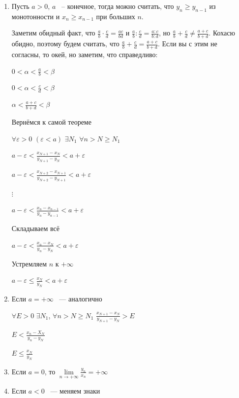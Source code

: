 \documentclass{article}
\begin{document}
			\begin{enumerate}
			
				\item Пусть $a > 0$, $a$ ~-- конечное, тогда можно считать, что $y_n \geq y_{n - 1}$ из монотонности и $x_n \geq x_{n - 1}$ при больших $n$.
			
					Заметим обидный факт, что $\frac{a}{b} \cdot \frac{c}{d} = \frac{ac}{bd}$ и $\frac{a}{b} : \frac{c}{d} = \frac{a : c}{b : d}$, но $\frac{a}{b} + \frac{c}{d} \neq \frac{a + c}{b + d}$. Кохасю обидно, поэтому будем считать, что $\frac{a}{b} + \frac{c}{d} = \frac{a + c}{b + d}$. Если вы с этим не согласны, то окей, но заметим, что справедливо:
			
					$0 < \alpha < \frac{a}{b} < \beta$
			
					$0 < \alpha < \frac{c}{d} < \beta$
			
					$\alpha < \frac{a + c}{b + d} < \beta$
			
					Вернёмся к самой теореме
			
					$\forall \varepsilon > 0$ $(\varepsilon < a)$ $\exists N_1$ $\forall n > N \geq N_1$
			
					$a - \varepsilon < \frac{x_{N + 1} - x_N}{y_{N + 1} - y_N} < a + \varepsilon$
			
					$a - \varepsilon < \frac{x_{N + 2} - x_{N + 1}}{y_{N + 2} - y_{N + 1}} < a + \varepsilon$
			
					$\vdots$
			
					$a - \varepsilon < \frac{x_n - x_{n - 1}}{y_n - y_{n - 1}} < a + \varepsilon$
			
					Складываем всё
			
					$a - \varepsilon < \frac{x_n - x_N}{y_n - y_N} < a + \varepsilon$
			
					Устремляем $n$ к $+\infty$
			
					$a - \varepsilon \leq \frac{x_N}{y_N} < a + \varepsilon$
			
				\item Если $a = +\infty$ ~--- аналогично
				
					$\forall E > 0$ $\exists N_1$, $\forall n > N \geq N_1$ $\frac{x_{N + 1} - x_{N}}{y_{N + 1} - y_N} > E$
					
					$E < \frac{x_n - X_N}{y_n - y_N}$
					
					$E \leq \frac{x_N}{y_N}$
					
				\item Если $a = 0$, то $\lim\limits_{n \rightarrow +\infty} \frac{y_n}{x_n} = +\infty$
				
				\item Если $a < 0$ ~--- меняем знаки
				
			\end{enumerate}						
		
\end{document}
